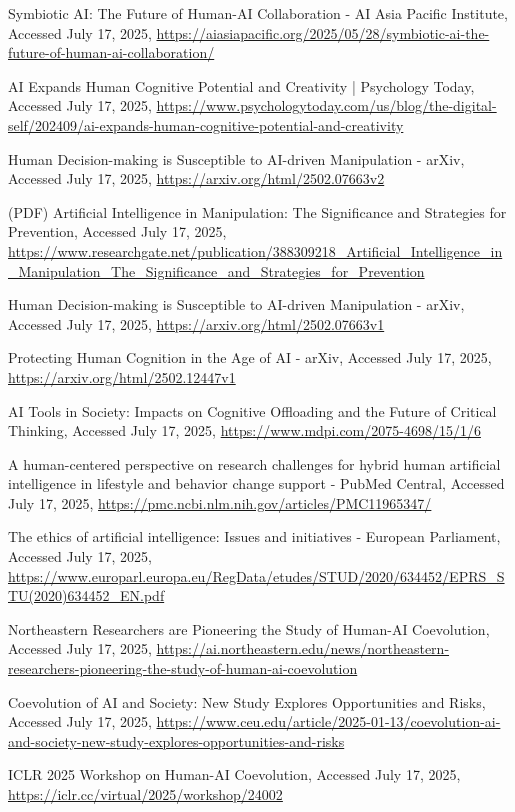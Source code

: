 \documentclass[10pt,twocolumn]{article}
\begin{document}
\begin{thebibliography}{68}
Symbiotic AI: The Future of Human-AI Collaboration - AI Asia Pacific Institute, Accessed July 17, 2025, \url{https://aiasiapacific.org/2025/05/28/symbiotic-ai-the-future-of-human-ai-collaboration/}

AI Expands Human Cognitive Potential and Creativity | Psychology Today, Accessed July 17, 2025, \url{https://www.psychologytoday.com/us/blog/the-digital-self/202409/ai-expands-human-cognitive-potential-and-creativity}

Human Decision-making is Susceptible to AI-driven Manipulation - arXiv, Accessed July 17, 2025, \url{https://arxiv.org/html/2502.07663v2}

(PDF) Artificial Intelligence in Manipulation: The Significance and Strategies for Prevention, Accessed July 17, 2025, \url{https://www.researchgate.net/publication/388309218_Artificial_Intelligence_in_Manipulation_The_Significance_and_Strategies_for_Prevention}

Human Decision-making is Susceptible to AI-driven Manipulation - arXiv, Accessed July 17, 2025, \url{https://arxiv.org/html/2502.07663v1}

Protecting Human Cognition in the Age of AI - arXiv, Accessed July 17, 2025, \url{https://arxiv.org/html/2502.12447v1}

AI Tools in Society: Impacts on Cognitive Offloading and the Future of Critical Thinking, Accessed July 17, 2025, \url{https://www.mdpi.com/2075-4698/15/1/6}

A human-centered perspective on research challenges for hybrid human artificial intelligence in lifestyle and behavior change support - PubMed Central, Accessed July 17, 2025, \url{https://pmc.ncbi.nlm.nih.gov/articles/PMC11965347/}

The ethics of artificial intelligence: Issues and initiatives - European Parliament, Accessed July 17, 2025, \url{https://www.europarl.europa.eu/RegData/etudes/STUD/2020/634452/EPRS_STU(2020)634452_EN.pdf}

Northeastern Researchers are Pioneering the Study of Human-AI Coevolution, Accessed July 17, 2025, \url{https://ai.northeastern.edu/news/northeastern-researchers-pioneering-the-study-of-human-ai-coevolution}

Coevolution of AI and Society: New Study Explores Opportunities and Risks, Accessed July 17, 2025, \url{https://www.ceu.edu/article/2025-01-13/coevolution-ai-and-society-new-study-explores-opportunities-and-risks}

ICLR 2025 Workshop on Human-AI Coevolution, Accessed July 17, 2025, \url{https://iclr.cc/virtual/2025/workshop/24002}

\end{thebibliography}
\end{document}
